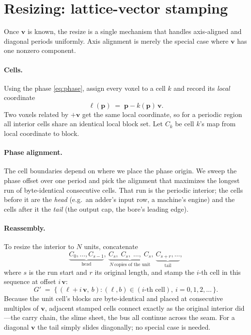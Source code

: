 \documentclass[11pt]{article}
\newcommand{\vv}{\mathbf{v}}
\newcommand{\pp}{\mathbf{p}}
\newcommand{\loc}{\boldsymbol{\ell}}
\begin{document}
\section{Resizing: lattice-vector stamping}\label{sec:stamp}

Once $\vv$ is known, the resize is a single mechanism that handles axis-aligned
and diagonal periods uniformly. Axis alignment is merely the special case where
$\vv$ has one nonzero component.

\paragraph{Cells.} Using the phase \eqref{eq:phase}, assign every voxel to a cell
$k$ and record its \emph{local} coordinate
\[
\loc(\pp) \;=\; \pp - k(\pp)\,\vv .
\]
Two voxels related by $+\vv$ get the same local coordinate, so for a periodic
region all interior cells share an identical local block set. Let $C_k$ be cell
$k$'s map from local coordinate to block.

\paragraph{Phase alignment.} The cell boundaries depend on where we place the
phase origin. We sweep the phase offset over one period and pick the alignment
that maximizes the longest run of byte-identical consecutive cells. That run is
the periodic interior; the cells before it are the \emph{head} (e.g.\ an adder's
input row, a machine's engine) and the cells after it the \emph{tail} (the
output cap, the bore's leading edge).

\paragraph{Reassembly.} To resize the interior to $N$ units, concatenate
\[
\underbrace{C_0,\dots,C_{s-1}}_{\text{head}},\
\underbrace{C_s,\;C_s,\;\dots,\;C_s}_{N\ \text{copies of the unit}},\
\underbrace{C_{s+r},\dots}_{\text{tail}},
\]
where $s$ is the run start and $r$ its original length, and stamp the $i$-th cell
in this sequence at offset $i\,\vv$:
\begin{equation}\label{eq:assemble}
G' \;=\; \bigl\{\,(\loc + i\,\vv,\ b) : (\loc,b)\in (\text{$i$-th cell}),\ i=0,1,2,\dots\,\bigr\}.
\end{equation}
Because the unit cell's blocks are byte-identical and placed at consecutive
multiples of $\vv$, adjacent stamped cells connect exactly as the original
interior did---the carry chain, the slime sheet, the bus all continue across the
seam. For a diagonal $\vv$ the tail simply slides diagonally; no special case is
needed.
\end{document}
